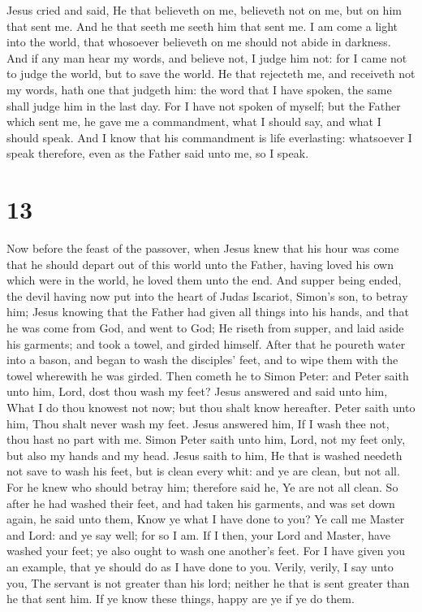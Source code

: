  Jesus cried and said, He that believeth on me, believeth
not on me, but on him that sent me.  And he that seeth me
seeth him that sent me.  I am come a light into the
world, that whosoever believeth on me should not abide in darkness.
 And if any man hear my words, and believe not, I judge
him not: for I came not to judge the world, but to save the world.
 He that rejecteth me, and receiveth not my words, hath
one that judgeth him: the word that I have spoken, the same shall judge
him in the last day.  For I have not spoken of myself;
but the Father which sent me, he gave me a commandment, what I should
say, and what I should speak.  And I know that his
commandment is life everlasting: whatsoever I speak therefore, even as
the Father said unto me, so I speak.

\hypertarget{section-12}{%
\section{13}\label{section-12}}

 Now before the feast of the passover, when Jesus knew
that his hour was come that he should depart out of this world unto the
Father, having loved his own which were in the world, he loved them unto
the end.  And supper being ended, the devil having now put
into the heart of Judas Iscariot, Simon's son, to betray him;
 Jesus knowing that the Father had given all things into
his hands, and that he was come from God, and went to God;
 He riseth from supper, and laid aside his garments; and
took a towel, and girded himself.  After that he poureth
water into a bason, and began to wash the disciples' feet, and to wipe
them with the towel wherewith he was girded.  Then cometh
he to Simon Peter: and Peter saith unto him, Lord, dost thou wash my
feet?  Jesus answered and said unto him, What I do thou
knowest not now; but thou shalt know hereafter.  Peter
saith unto him, Thou shalt never wash my feet. Jesus answered him, If I
wash thee not, thou hast no part with me.  Simon Peter
saith unto him, Lord, not my feet only, but also my hands and my head.
 Jesus saith to him, He that is washed needeth not save
to wash his feet, but is clean every whit: and ye are clean, but not
all.  For he knew who should betray him; therefore said
he, Ye are not all clean.  So after he had washed their
feet, and had taken his garments, and was set down again, he said unto
them, Know ye what I have done to you?  Ye call me Master
and Lord: and ye say well; for so I am.  If I then, your
Lord and Master, have washed your feet; ye also ought to wash one
another's feet.  For I have given you an example, that ye
should do as I have done to you.  Verily, verily, I say
unto you, The servant is not greater than his lord; neither he that is
sent greater than he that sent him.  If ye know these
things, happy are ye if ye do them.

